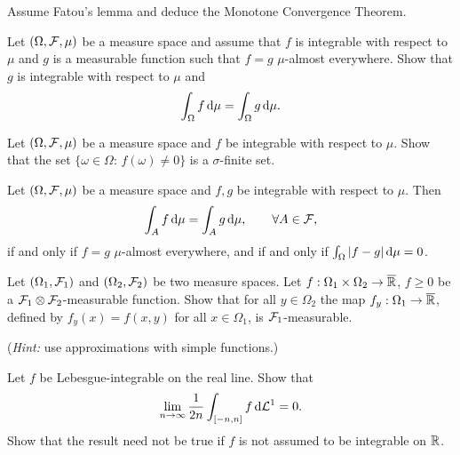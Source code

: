 \begin{problem}
    Assume Fatou's lemma and deduce the Monotone Convergence Theorem.
\end{problem}

\begin{problem} Let $(\Omega,\mathcal F,\mu)$ be a measure space and assume that $f$ is integrable with respect to $\mu$ and $g$ is a measurable function such that $f = g$ $\mu$-almost everywhere. Show that $g$ is integrable with respect to $\mu$ and 
    \begin{equation*}
        \int_\Omega f\, \mathrm{d} \mu =  \int_\Omega g\, \mathrm{d} \mu.
    \end{equation*}
\end{problem}

\begin{problem}  Let $(\Omega,\mathcal F,\mu)$ be a measure space and $f$ be integrable with respect to $\mu$. Show that the set $\{\omega\in \Omega :\, f(\omega) \neq 0 \}$ is a $\sigma$-finite set. 
\end{problem}

\begin{problem}
    Let $(\Omega,\mathcal F,\mu)$ be a measure space and $f,g$ be integrable with respect to $\mu$. Then 
    \begin{equation*}
        \int_A f \,\mathrm{d} \mu = \int_A g \,\mathrm{d} \mu,\qquad \forall A\in\mathcal F,
    \end{equation*}
    if and only if $f = g$ $\mu$-almost everywhere, and if and only if $\int_{\Omega}|f-g|\,\mathrm{d} \mu = 0$.
\end{problem}

\begin{problem}
    Let $(\Omega_1,\mathcal F_1)$ and $(\Omega_2,\mathcal F_2)$ be two measure spaces. Let $f:\Omega_1\times\Omega_2\to \overline{\mathbb R}$, $f\geq 0$ be a $\mathcal F_1\otimes \mathcal F_2$-measurable function. Show that for all $y\in \Omega_2$ the map $f_y : \Omega_1\to \overline{\mathbb R}$, defined by $f_y(x) = f(x,y)$ for all $x\in \Omega_1$, is $\mathcal F_1$-measurable.

    \noindent (\emph{Hint:} use approximations with simple functions.)
\end{problem}

\begin{problem}
    Let $f$ be Lebesgue-integrable on the real line. Show that
    \begin{equation*}
        \lim_{n\to\infty} \frac{1}{2 n} \int_{[-n,n]} f \,\mathrm{d}\mathcal L^1 = 0.
    \end{equation*}
    Show that the result need not be true if $f$ is not assumed to be integrable on $\mathbb R$.
\end{problem}

